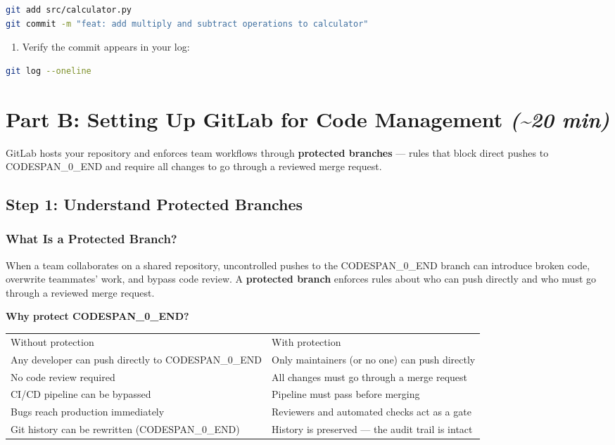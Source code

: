 \documentclass[11pt,a4paper]{book}
\begin{document}
\begin{lstlisting}[language=Bash]
git add src/calculator.py
git commit -m "feat: add multiply and subtract operations to calculator"
\end{lstlisting}

\begin{enumerate}
  \item Verify the commit appears in your log:
\end{enumerate}

\begin{lstlisting}[language=Bash]
git log --oneline
\end{lstlisting}

\medskip

\section{Part B: Setting Up GitLab for Code Management \textit{(\textasciitilde{}20 min)}}

GitLab hosts your repository and enforces team workflows through \textbf{protected branches} --- rules that block direct pushes to CODESPAN\_0\_END and require all changes to go through a reviewed merge request.

\subsection{Step 1: Understand Protected Branches}

\subsubsection{What Is a Protected Branch?}

When a team collaborates on a shared repository, uncontrolled pushes to the CODESPAN\_0\_END branch can introduce broken code, overwrite teammates' work, and bypass code review. A \textbf{protected branch} enforces rules about who can push directly and who must go through a reviewed merge request.

\textbf{Why protect CODESPAN\_0\_END?}

\begin{tabular}{ll}
\hline
Without protection & With protection \\
Any developer can push directly to CODESPAN\_0\_END & Only maintainers (or no one) can push directly \\
No code review required & All changes must go through a merge request \\
CI/CD pipeline can be bypassed & Pipeline must pass before merging \\
Bugs reach production immediately & Reviewers and automated checks act as a gate \\
Git history can be rewritten (CODESPAN\_0\_END) & History is preserved --- the audit trail is intact \\
\hline
\end{tabular}
\end{document}
